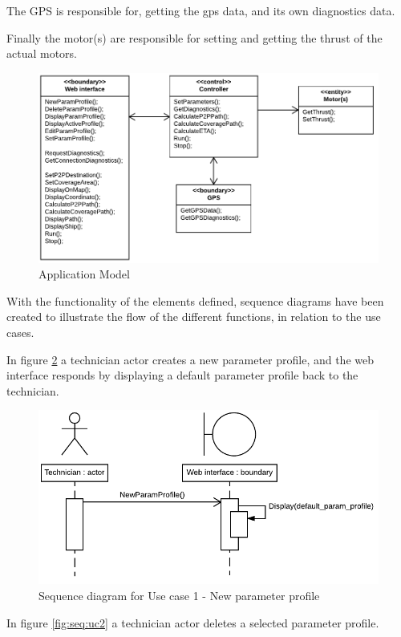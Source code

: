 The GPS is responsible for, getting the gps data, and its own diagnostics data.

Finally the motor(s) are responsible for setting and getting the thrust of the actual motors.

\begin{figure}[H]
	\centering
	\includegraphics[width=1\linewidth]{Images/System_architecture/Application_Model}
	\caption{Application Model}
	\label{fig:appliction_model}
\end{figure}

With the functionality of the elements defined, sequence diagrams have been created to illustrate the flow of the different functions, in relation to the use cases.

In figure \ref{fig:seq:uc1} a technician actor creates a new parameter profile, and the web interface responds by displaying a default parameter profile back to the technician.

\begin{figure}[H]
	\centering
	\includegraphics[width=0.8\linewidth]{Images/System_architecture/Use_case_1_SD}
	\caption{Sequence diagram for Use case 1 - New parameter profile}
	\label{fig:seq:uc1}
\end{figure}

In figure \ref{fig:seq:uc2} a technician actor deletes a selected parameter profile.

